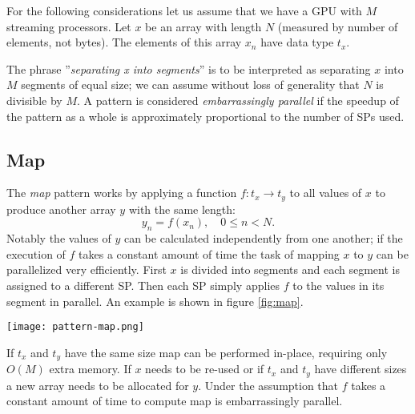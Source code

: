 For the following considerations let us assume that we have a GPU with $M$ streaming processors.
Let $x$ be an array with length $N$ (measured by number of elements, not bytes).
The elements of this array $x_n$ have data type $t_x$.

The phrase ''\textit{separating x into segments}'' is to be interpreted as separating $x$ into $M$ segments of equal size;
we can assume without loss of generality that $N$ is divisible by $M$.
A pattern is considered \textit{embarrassingly parallel} if the speedup of the pattern as a whole
is approximately proportional to the number of SPs used.
\subsection{Map}
\label{map}
The \textit{map} pattern works by applying a function $f: t_x \rightarrow t_y$
to all values of $x$ to produce another array $y$ with the same length:
\begin{equation}
	y_n = f(x_n), \quad 0 \le n < N.
\end{equation}
Notably the values of $y$ can be calculated independently from one another;
if the execution of $f$ takes a constant amount of time the task of mapping $x$ to $y$ can be parallelized very efficiently.
First $x$ is divided into segments and each segment is assigned to a different SP.
Then each SP simply applies $f$ to the values in its segment in parallel.
An example is shown in figure \ref{fig:map}.
\begin{figure*}
	\centering
	\texttt{[image: pattern-map.png]}
	\caption{
		Visualization of the map pattern.
		3-vectors are mapped to their lengths.
		Because the two data types have different sizes the operation is not performed in-place.
	}
	\label{fig:map}
\end{figure*}
If $t_x$ and $t_y$ have the same size map can be performed in-place, requiring only $O(M)$ extra memory.
If $x$ needs to be re-used or if $t_x$ and $t_y$ have different sizes a new array needs to be allocated for $y$.
Under the assumption that $f$ takes a constant amount of time to compute map is embarrassingly parallel.
